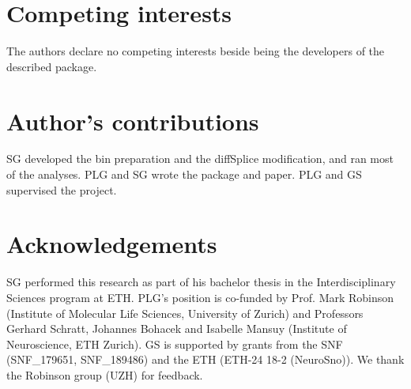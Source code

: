 \documentclass{bmcart}
\begin{document}
\begin{backmatter}

\section*{Competing interests}
  The authors declare no competing interests beside being the developers of the described package.

\section*{Author's contributions}
  SG developed the bin preparation and the diffSplice modification, and ran most of the analyses. PLG and SG wrote the package and paper. PLG and GS supervised the project.

\section*{Acknowledgements}
  SG performed this research as part of his bachelor thesis in the Interdisciplinary Sciences program at ETH. PLG's position is co-funded by Prof. Mark Robinson (Institute of Molecular Life Sciences, University of Zurich) and Professors Gerhard Schratt, Johannes Bohacek and Isabelle Mansuy (Institute of Neuroscience, ETH Zurich). GS is supported by grants from the SNF (SNF\_179651, SNF\_189486) and the ETH (ETH-24 18-2 (NeuroSno)). We thank the Robinson group (UZH) for feedback.




\end{backmatter}
\end{document}
